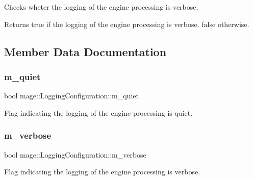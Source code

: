 Checks wheter the logging of the engine processing is verbose.

\begin{DoxyReturn}{Returns}
{\ttfamily true} if the logging of the engine processing is verbose. {\ttfamily false} otherwise. 
\end{DoxyReturn}


\subsection{Member Data Documentation}
\hypertarget{structmage_1_1_logging_configuration_a38f457d5db84d15e008841ca8653b47c}{}\label{structmage_1_1_logging_configuration_a38f457d5db84d15e008841ca8653b47c} 
\subsubsection{\texorpdfstring{m\+\_\+quiet}{m\_quiet}}
{\footnotesize\ttfamily bool mage\+::\+Logging\+Configuration\+::m\+\_\+quiet\hspace{0.3cm}{\ttfamily [private]}}

Flag indicating the logging of the engine processing is quiet. \hypertarget{structmage_1_1_logging_configuration_a60f052c2bb702d8153188e93f00427ac}{}\label{structmage_1_1_logging_configuration_a60f052c2bb702d8153188e93f00427ac} 
\subsubsection{\texorpdfstring{m\+\_\+verbose}{m\_verbose}}
{\footnotesize\ttfamily bool mage\+::\+Logging\+Configuration\+::m\+\_\+verbose\hspace{0.3cm}{\ttfamily [private]}}

Flag indicating the logging of the engine processing is verbose. 